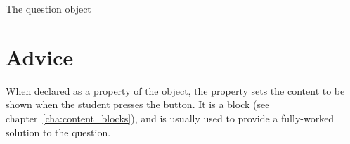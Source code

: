\begin{chapter}{\label{cha:question_object}The question object}
  \section{\label{sec:advice_content}Advice}
  When declared as a property of the  object, the
   property sets the content to be shown when the student
  presses the  button.  It is a  block
  (see chapter~\ref{cha:content_blocks}), and is usually used to provide a
  fully-worked solution to the question.

\end{chapter}
